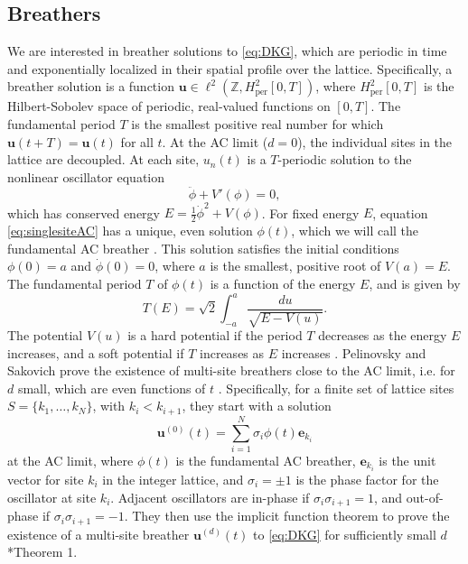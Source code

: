 \documentclass[12pt,reqno]{amsart}
\def\Z{{\mathbb Z}}
\def\per{\textrm{per}}
\newcommand{\evec}{\mathbf{e}}
\newcommand{\uvec}{\mathbf{u}}
\theoremstyle{definition}
\begin{document}
\subsection{Breathers}\label{sec:DKGbreather}

We are interested in breather solutions to \cref{eq:DKG}, which are periodic in time and exponentially localized in their spatial
profile over the lattice. Specifically, a breather solution is a function $\uvec \in \ell^2(\Z, H^2_\per[0,T])$, where $H^2_\per[0,T]$ is the Hilbert-Sobolev space of periodic, real-valued functions on $[0,T]$. 
The fundamental period $T$ is the smallest positive real number for which $\uvec(t+T) = \uvec(t)$ for all $t$. At the AC limit ($d = 0$), the individual sites in the lattice are decoupled. At each site, $u_n(t)$ is a $T$-periodic solution to the nonlinear oscillator equation
\begin{equation}\label{eq:singlesiteAC}
\ddot{\phi} + V'(\phi) = 0,
\end{equation}
which has conserved energy $E = \frac{1}{2}\dot{\phi}^2 + V(\phi)$. For fixed energy $E$, equation \cref{eq:singlesiteAC} has a unique, even solution $\phi(t)$, which we will call the fundamental AC breather \cite{Pelinovsky2012}. This solution satisfies the initial conditions $\phi(0) = a$ and $\dot{\phi}(0) = 0$, where $a$ is the smallest, positive root of $V(a) = E$. The fundamental period $T$ of $\phi(t)$ is a function of the energy $E$, and is given by
\begin{equation}\label{eq:TE}
T(E) = \sqrt{2}\int_{-a}^a \frac{du}{\sqrt{E - V(u)}}.
\end{equation}
The potential $V(u)$ is a hard potential if the period $T$ decreases as the energy $E$ increases, and a soft potential if $T$ increases as $E$ increases \cites{Pelinovsky2012,cuevas-maraver2016}.
Pelinovsky and Sakovich prove the existence of multi-site breathers close to the AC limit, i.e. for $d$ small, which are even functions of $t$ \cite{Pelinovsky2012}. Specifically, for a finite set of lattice sites $S = \{ k_1, \dots, k_N \}$, with $k_i < k_{i+1}$, they start with a solution
\begin{equation}
\uvec^{(0)}(t) = \sum_{i=1}^N \sigma_i \phi(t) \evec_{k_i}
\end{equation}
at the AC limit, where $\phi(t)$ is the fundamental AC breather, $\evec_{k_i}$ is the unit vector for site $k_i$ in the integer lattice, and $\sigma_i = \pm 1$ is the phase factor for the oscillator at site $k_i$. Adjacent oscillators are in-phase if $\sigma_i \sigma_{i+1} = 1$, and out-of-phase if $\sigma_i \sigma_{i+1} = -1$. They then use the implicit function theorem to prove the existence of a multi-site breather $\uvec^{(d)}(t)$ to \cref{eq:DKG} for sufficiently small $d$ \cite{Pelinovsky2012}*{Theorem 1}. 
\end{document}

